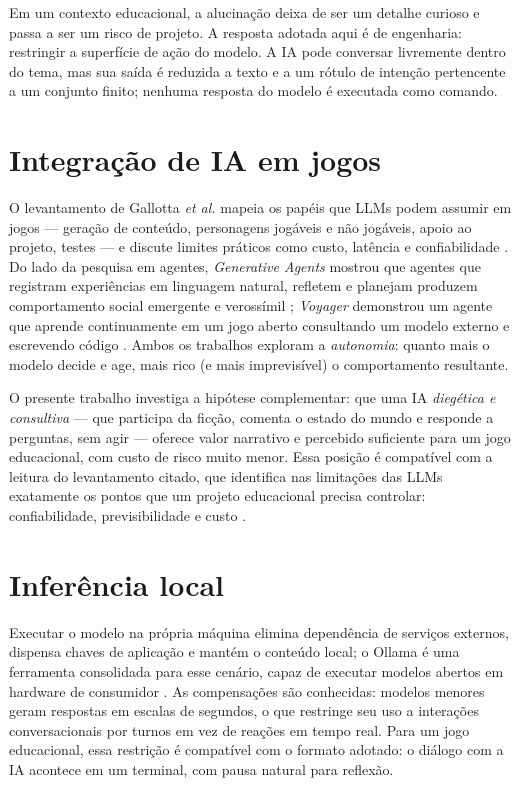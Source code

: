 Em um contexto educacional, a alucinação deixa de ser um detalhe curioso e
passa a ser um risco de projeto. A resposta adotada aqui é de engenharia:
restringir a superfície de ação do modelo. A IA pode conversar livremente
dentro do tema, mas sua saída é reduzida a texto e a um rótulo de intenção
pertencente a um conjunto finito; nenhuma resposta do modelo é executada como
comando.

\section{Integração de IA em jogos}
\label{sec:ia_jogos}

O levantamento de Gallotta \emph{et al.} mapeia os papéis que LLMs podem
assumir em jogos --- geração de conteúdo, personagens jogáveis e não jogáveis,
apoio ao projeto, testes --- e discute limites práticos como custo, latência e
confiabilidade \cite{gallotta2024largelanguage}. Do lado da pesquisa em
agentes, \emph{Generative Agents} mostrou que agentes que registram
experiências em linguagem natural, refletem e planejam produzem comportamento
social emergente e verossímil \cite{park2023generative}; \emph{Voyager}
demonstrou um agente que aprende continuamente em um jogo aberto consultando
um modelo externo e escrevendo código \cite{wang2023voyager}. Ambos os
trabalhos exploram a \emph{autonomia}: quanto mais o modelo decide e age, mais
rico (e mais imprevisível) o comportamento resultante.

O presente trabalho investiga a hipótese complementar: que uma IA
\emph{diegética e consultiva} --- que participa da ficção, comenta o estado do
mundo e responde a perguntas, sem agir --- oferece valor narrativo e percebido
suficiente para um jogo educacional, com custo de risco muito menor. Essa
posição é compatível com a leitura do levantamento citado, que identifica nas
limitações das LLMs exatamente os pontos que um projeto educacional precisa
controlar: confiabilidade, previsibilidade e custo \cite{gallotta2024largelanguage}.

\section{Inferência local}
\label{sec:inferencia_local}

Executar o modelo na própria máquina elimina dependência de serviços externos,
dispensa chaves de aplicação e mantém o conteúdo local; o Ollama é uma
ferramenta consolidada para esse cenário, capaz de executar modelos abertos em
hardware de consumidor \cite{ollama2026}. As compensações são conhecidas:
modelos menores geram respostas em escalas de segundos, o que restringe seu
uso a interações conversacionais por turnos em vez de reações em tempo real.
Para um jogo educacional, essa restrição é compatível com o formato adotado:
o diálogo com a IA acontece em um terminal, com pausa natural para reflexão.

